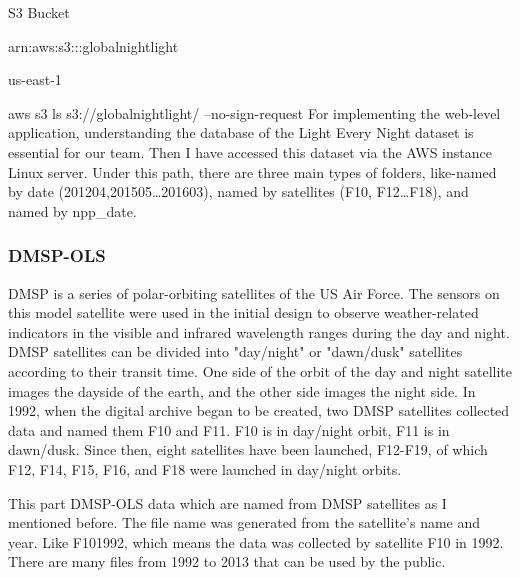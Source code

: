 \documentclass[conference]{IEEEtran}
\begin{document}

S3 Bucket


arn:aws:s3:::globalnightlight


us-east-1


aws s3 ls s3://globalnightlight/ --no-sign-request
For implementing the web-level application, understanding the database of the Light Every Night dataset is essential 
for our team. Then I have accessed this dataset via the AWS instance Linux server. 
Under this path, there are three main types of folders, like-named by date (201204,201505…201603), named by satellites 
(F10, F12…F18), and named by npp\_date.

\subsubsection{DMSP-OLS}

DMSP is a series of polar-orbiting satellites of the US Air Force. The sensors on this model satellite were used in the 
initial design to observe weather-related indicators in the visible and infrared wavelength ranges during the day and night. 
DMSP satellites can be divided into "day/night" or "dawn/dusk" satellites according to their transit time. One side of the 
orbit of the day and night satellite images the dayside of the earth, and the other side images the night side. In 1992, when 
the digital archive began to be created, two DMSP satellites collected data and named them F10 and F11. F10 is in day/night 
orbit, F11 is in dawn/dusk. Since then, eight satellites have been launched, F12-F19, of which F12, F14, F15, F16, and F18 
were launched in day/night orbits.

This part DMSP-OLS data which are named from DMSP satellites as I mentioned before. The file name was generated from the 
satellite's name and year. Like F101992, which means the data was collected by satellite F10 in 1992. There are many files 
from 1992 to 2013 that can be used by the public.
\end{document}
